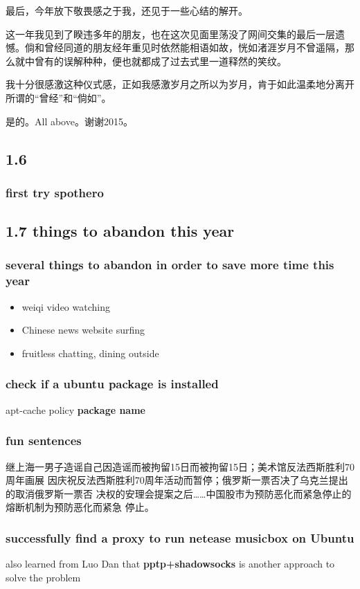 \documentclass[11pt]{article}
\begin{document}
最后，今年放下敬畏感之于我，还见于一些心结的解开。

这一年我见到了睽违多年的朋友，也在这次见面里荡没了网间交集的最后一层遗憾。倘和曾经同道的朋友经年重见时依然能相语如故，恍如渚涯岁月不曾遥隔，那么就中曾有的误解种种，便也就都成了过去式里一道释然的笑纹。

我十分很感激这种仪式感，正如我感激岁月之所以为岁月，肯于如此温柔地分离开所谓的“曾经”和“倘如”。

是的。All above。谢谢2015。
\subsection*{1.6}
\label{sec:orgheadline12}
\subsubsection*{first try spothero}
\label{sec:orgheadline11}
\subsection*{1.7 things to abandon this year}
\label{sec:orgheadline23}
\subsubsection*{several things to abandon in order to save more time this year}
\label{sec:orgheadline16}
\begin{itemize}
\item weiqi video watching
\label{sec:orgheadline13}
\item Chinese news website surfing
\label{sec:orgheadline14}
\item fruitless chatting, dining outside
\label{sec:orgheadline15}
\end{itemize}
\subsubsection*{check if a ubuntu package is installed}
\label{sec:orgheadline17}
apt-cache policy \textbf{package name}
\subsubsection*{fun sentences}
\label{sec:orgheadline18}
继上海一男子造谣自己因造谣而被拘留15日而被拘留15日；美术馆反法西斯胜利70周年画展
因庆祝反法西斯胜利70周年活动而暂停；俄罗斯一票否决了乌克兰提出的取消俄罗斯一票否
决权的安理会提案之后\ldots{}\ldots{}中国股市为预防恶化而紧急停止的熔断机制为预防恶化而紧急
停止。
\subsubsection*{successfully find a proxy to run netease musicbox on Ubuntu}
\label{sec:orgheadline19}
also learned from Luo Dan that \textbf{pptp+shadowsocks} is another approach to solve the problem
\end{document}
